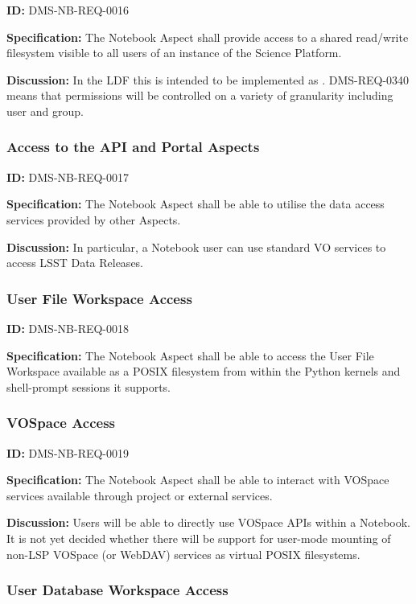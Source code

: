 \documentclass[SE,toc,lsstdraft]{lsstdoc}
\begin{document}
\label{DMS-NB-REQ-0016}
\textbf{ID:} DMS-NB-REQ-0016

\textbf{Specification:}
The Notebook Aspect shall provide access to a shared read/write filesystem visible to all users of an instance of the Science Platform.

\textbf{Discussion:}
In the LDF this is intended to be implemented as .
DMS-REQ-0340 means that permissions will be controlled on a variety of granularity including user and group.

\subsubsection{Access to the API and Portal Aspects}

\label{DMS-NB-REQ-0017}
\textbf{ID:} DMS-NB-REQ-0017

\textbf{Specification:}
The Notebook Aspect shall be able to utilise the data access services provided by other Aspects.

\textbf{Discussion:}
In particular, a Notebook user can use standard VO services to access LSST Data Releases.

\subsubsection{User File Workspace Access}

\label{DMS-NB-REQ-0018}
\textbf{ID:} DMS-NB-REQ-0018

\textbf{Specification:}
The Notebook Aspect shall be able to access the User File Workspace available as a POSIX filesystem from within the Python kernels and shell-prompt sessions it supports.

\subsubsection{VOSpace Access}

\label{DMS-NB-REQ-0019}
\textbf{ID:} DMS-NB-REQ-0019

\textbf{Specification:}
The Notebook Aspect shall be able to interact with VOSpace services available through project or external services.

\textbf{Discussion:}
Users will be able to directly use VOSpace APIs within a Notebook.  It is not yet decided whether there will be support for user-mode mounting of non-LSP VOSpace (or WebDAV) services as virtual POSIX filesystems.

\subsubsection{User Database Workspace Access}
\end{document}
